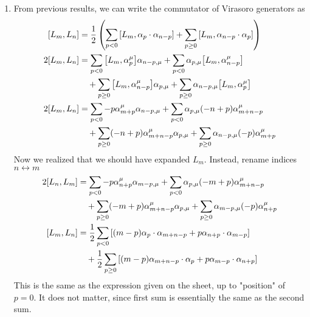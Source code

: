 \begin{enumerate}[label=(\alph*)]
	\item From previous results, we can write the commutator of Virasoro generators as
		\begin{align*}
			\comm{L_m}{L_n} &= \frac{1}{2} \left( \sum_{p<0} \comm{L_m}{\alpha_p \cdot \alpha_{n-p}} + \sum_{p \geq 0} \comm{L_m}{\alpha_{n-p} \cdot \alpha_{p}}\right) \\
			2 \comm{L_m}{L_n} &=  \sum_{p<0} \comm{L_m}{\alpha_p^\mu  } \alpha_{n-p, \mu} + \sum_{p<0} \alpha_{p, \mu} \comm{L_m}{\alpha_{n-p}^\mu} \\
									&\quad + \sum_{p \geq 0} \comm{L_m}{\alpha_{n-p}^\mu } \alpha_{p, \mu} + \sum_{p \geq 0} \alpha_{n-p, \mu}\comm{L_m}{ \alpha_{p}^\mu}\\
			2 \comm{L_m}{L_n} &=  \sum_{p<0} -p \alpha^\mu_{m + p} \alpha_{n-p, \mu} + \sum_{p<0} \alpha_{p, \mu} (-n+p) \alpha^\mu_{m+n-p} \\
									&\quad + \sum_{p \geq 0} (-n+p)\alpha_{m+n-p}^\mu \alpha_{p, \mu} + \sum_{p \geq 0} \alpha_{n-p, \mu} (-p) \alpha_{m+p}^\mu\\
		\end{align*}
		Now we realized that we should have expanded $L_m$. Instead, rename indices $n \leftrightarrow m$
		\begin{align*}
			2 \comm{L_n}{L_m} &=  \sum_{p<0} -p \alpha^\mu_{n + p} \alpha_{m-p, \mu} + \sum_{p<0} \alpha_{p, \mu} (-m+p) \alpha^\mu_{m+n-p} \\
									&\quad + \sum_{p \geq 0} (-m+p)\alpha_{m+n-p}^\mu \alpha_{p, \mu} + \sum_{p \geq 0} \alpha_{m-p, \mu} (-p) \alpha_{n+p}^\mu\\
			\comm{L_m}{L_n} &= \frac{1}{2} \sum_{p<0}\left[  (m-p) \alpha_{p} \cdot \alpha_{m+n-p} + p \alpha_{n + p} \cdot \alpha_{m-p}  \right]\\
								 &\quad + \frac{1}{2} \sum_{p \geq 0}\left[  (m-p)\alpha_{m+n-p} \cdot \alpha_{p} +  p \alpha_{m-p} \cdot \alpha_{n+p} \right] \\
		\end{align*}
		This is the same as the expression given on the sheet, up to "position" of $p=0$. It does not matter, since first sum is essentially the same as the second sum.


\end{enumerate}
